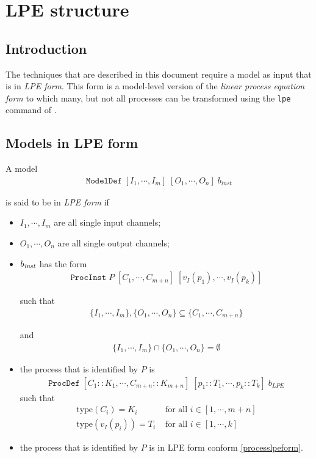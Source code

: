 \chapter{LPE structure}

\section{Introduction}
The techniques that are described in this document require a \txs{} model as input that is in \emph{LPE form}.
This form is a model-level version of the \emph{linear process equation form} to which many, but not all \txs{} processes can be transformed using the \texttt{lpe} command of \txs{}.

\section{Models in LPE form} \label{modellpeform}

A \txs{} model
\begin{align*}
\texttt{ModelDef} \; [I_1, \cdots{}, I_m] \; [O_1, \cdots{}, O_n] \; b_\textit{inst}
\end{align*}

is said to be in \emph{LPE form} if

\begin{itemize}
\item $I_1, \cdots{}, I_m$ are all single input channels;
\item $O_1, \cdots{}, O_n$ are all single output channels;
\item $b_\text{\textit{inst}}$ has the form
\begin{align*}
\texttt{ProcInst} \; P \; [C_1, \cdots{}, C_{m+n}] \; [v_I(p_1), \cdots{}, v_I(p_k)]
\end{align*}

such that
\begin{align*}
\{ I_1, \cdots{}, I_m \}, \{ O_1, \cdots{}, O_n \} \subseteq \{ C_1, \cdots{}, C_{m+n} \}
\end{align*}

and
\begin{align*}
\{ I_1, \cdots{}, I_m \} \cap \{ O_1, \cdots{}, O_n \} = \emptyset{}
\end{align*}

\item the \txs{} process that is identified by $P$ is
\begin{align*}
\texttt{ProcDef} \; [C_1 :: K_1, \cdots{}, C_{m+n} :: K_{m+n}] \; [p_1 :: T_1, \cdots{}, p_k :: T_k] \; b_\textit{LPE}
\end{align*}
such that
\begin{align*}
\text{type}(C_i) = K_i &\text{ for all } i \in [1, \cdots{}, m+n] \\
\text{type}(v_I(p_i)) = T_i &\text{ for all } i \in [1, \cdots{}, k]
\end{align*}

\item the \txs{} process that is identified by $P$ is in LPE form conform \ref{processlpeform}.
\end{itemize}

